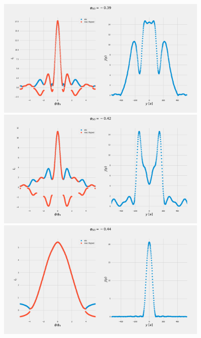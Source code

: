\documentclass[a4paper]{article}
\begin{document}
\begin{figure}
	\includegraphics[width=0.9\textwidth]{figs/wg31/current_and_density_039}
	\includegraphics[width=0.9\textwidth]{figs/wg31/current_and_density_042}
	\includegraphics[width=0.9\textwidth]{figs/wg31/current_and_density_044}
\end{figure}
\end{document}
